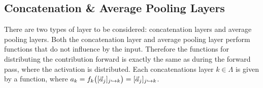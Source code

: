 



\subsection{Concatenation \& Average Pooling Layers}

There are two types of layer to be considered: concatenation layers and average pooling layers. Both the concatenation layer and average pooling layer perform functions that do not influence by the input. Therefore the functions for distributing the contribution forward is exactly the same as during the forward pass, where the activation is distributed. Each concatenations layer $k\in \Lambda$ is given by a function, where $a_k = f_k\big([\vec{a}_j]_{j\hookrightarrow k}\big) = [\vec{a}_j]_{j\hookrightarrow k}$. 

